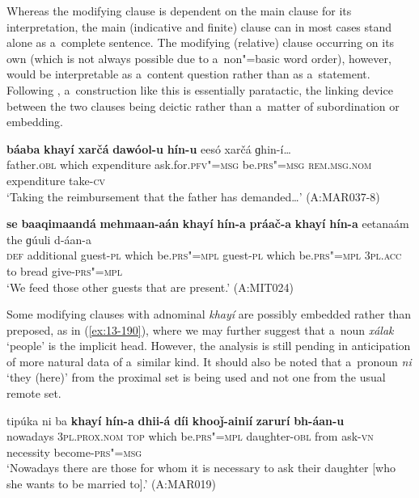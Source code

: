 Whereas the modifying clause is dependent on the main clause for its interpretation, the main (indicative and finite) clause can in most cases stand alone as a~complete sentence. The modifying (relative) clause occurring on its own (which is not always possible due to a~non"=basic word order), however, would be interpretable as a~content question rather than as a~statement. Following \citet[182]{givon2001b}, a~construction like this is essentially paratactic, the linking device between the two clauses being deictic rather than a~matter of subordination or embedding.

\begin{exe}
\ex
\label{ex:13-188}
\gll \textbf{báaba} \textbf{khayí} \textbf{xarčá} \textbf{dawóol-u} \textbf{hín-u}  eesó xarčá ɡhin-í{\ldots}  \\
father.\textsc{obl} which expenditure ask.for.\textsc{pfv"=msg} be.\textsc{prs"=msg} \textsc{rem.msg.nom} expenditure take-\textsc{cv} \\
\glt `Taking the reimbursement that the father has demanded{\ldots}' (A:MAR037-8)

\ex
\label{ex:13-189}
\gll \textbf{se} \textbf{baaqimaandá} \textbf{mehmaan-aán} \textbf{khayí} \textbf{hín-a} \textbf{práač-a} \textbf{khayí} \textbf{hín-a} eetanaám the ɡúuli d-áan-a\\
\textsc{def} additional guest-\textsc{pl} which be.\textsc{prs"=mpl} guest-\textsc{pl} which be.\textsc{prs"=mpl} \textsc{3pl.acc} to bread give-\textsc{prs"=mpl} \\
\glt `We feed those other guests that are present.' (A:MIT024) 
\end{exe}

Some modifying clauses with adnominal \textit{khayí} are possibly embedded rather than preposed, as in (\ref{ex:13-190}), where we may further suggest that a~noun \textit{xálak} `people' is the implicit head. However, the analysis is still pending in anticipation of more natural data of a~similar kind. It should also be noted that a~pronoun \textit{ni} `they (here)' from the proximal set is being used and not one from the usual remote set.

\ea
\label{ex:13-190}
\gll tipúka ni ba \textbf{khayí} \textbf{hín-a} \textbf{dhii-á} \textbf{díi} \textbf{khooǰ-ainií} \textbf{zarurí} \textbf{bh-áan-u}\\
nowadays \textsc{3pl.prox.nom} \textsc{top} which be.\textsc{prs"=mpl}  daughter-\textsc{obl} from ask-\textsc{vn} necessity become-\textsc{prs"=msg}\\
\glt `Nowadays there are those for whom it is necessary to ask their daughter [who she wants to be married to].' (A:MAR019) 
\z

